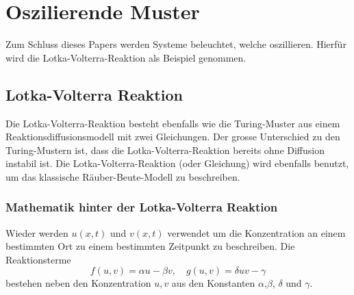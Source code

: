 %
%
%
%
\section{Oszilierende Muster
\label{reaktdiff:section:teil2}}
Zum Schluss dieses Papers werden Systeme beleuchtet, welche oszillieren.
Hierfür wird die Lotka-Volterra-Reaktion als Beispiel genommen.


\subsection{Lotka-Volterra Reaktion 
\label{reaktdiff:subsection:bonorum}}

Die Lotka-Volterra-Reaktion \cite{Wikipedia_LotkaVolterra_2025}  besteht ebenfalls wie die Turing-Muster aus einem Reaktionsdiffusionsmodell mit zwei Gleichungen.
Der grosse Unterschied zu den Turing-Mustern ist, dass die Lotka-Volterra-Reaktion bereits ohne Diffusion instabil ist.
Die Lotka-Volterra-Reaktion (oder Gleichung) wird ebenfalls benutzt, um das klassische Räuber-Beute-Modell zu beschreiben.

\subsubsection{Mathematik hinter der Lotka-Volterra Reaktion}

Wieder werden \(u(x,t)\) und \(v(x,t)\) verwendet um die Konzentration an einem bestimmten Ort zu einem bestimmten Zeitpunkt zu beschreiben.
Die Reaktionsterme
\begin{equation}
     f(u,v) = \alpha u -  \beta v, \quad g(u,v)= \delta uv - \gamma
      \label{reaktdiff:equation:lvsys}
\end{equation}
bestehen neben den Konzentration \(u,v\) aus den Konstanten \(\alpha\),\(\beta\), \(\delta\) und \(\gamma\).

